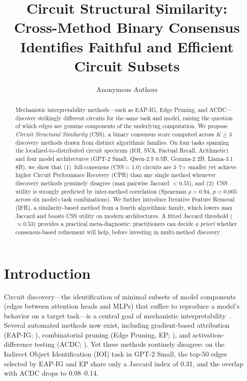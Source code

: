 \documentclass[11pt,a4paper]{article}
\title{Circuit Structural Similarity: Cross-Method Binary Consensus\\Identifies Faithful and Efficient Circuit Subsets}
\author{
  Anonymous Authors
}
\date{}
\newcommand{\css}{\textsc{CSS}}
\begin{document}
\maketitle

\begin{abstract}
Mechanistic interpretability methods---such as EAP-IG, Edge Pruning, and ACDC---discover strikingly different circuits for the same task and model, raising the question of which edges are genuine components of the underlying computation.
We propose \emph{Circuit Structural Similarity} (\css{}), a binary consensus score computed across $K\!\ge\!3$ discovery methods drawn from distinct algorithmic families.
On four tasks spanning the localized-to-distributed circuit spectrum (IOI, SVA, Factual Recall, Arithmetic) and four model architectures (GPT-2 Small, Qwen-2.5 0.5B, Gemma-2 2B, Llama-3.1 8B), we show that (1)~full-consensus (\css{}$=1.0$) circuits are 3--7$\times$ smaller yet achieve higher Circuit Performance Recovery (CPR) than any single method whenever discovery methods genuinely disagree (max pairwise Jaccard $< 0.55$), and (2)~\css{} utility is strongly predicted by inter-method correlation (Spearman $\rho\!=\!0.94$, $p\!=\!0.005$ across six model$\times$task combinations).
We further introduce Iterative Feature Removal (IFR), a similarity-based method from a fourth algorithmic family, which lowers max Jaccard and boosts \css{} utility on modern architectures.
A fitted Jaccard threshold ($\approx\!0.53$) provides a practical meta-diagnostic: practitioners can decide \emph{a priori} whether consensus-based refinement will help, before investing in multi-method discovery.
\end{abstract}

\section{Introduction}

Circuit discovery---the identification of minimal subsets of model components (edges between attention heads and MLPs) that suffice to reproduce a model's behavior on a target task---is a central goal of mechanistic interpretability~\cite{elhage2021mathematical,conmy2023towards,wang2023interpretability}.
Several automated methods now exist, including gradient-based attribution (EAP-IG; \citet{syed2023attribution}), combinatorial pruning (Edge Pruning, EP; \citet{li2024circuit}), and activation-difference testing (ACDC; \citet{conmy2023towards}).
Yet these methods routinely disagree: on the Indirect Object Identification (IOI) task in GPT-2 Small, the top-50 edges selected by EAP-IG and EP share only a Jaccard index of 0.31, and the overlap with ACDC drops to 0.08--0.14.
\end{document}
